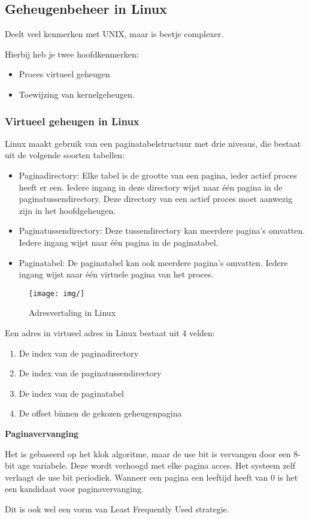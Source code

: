 \subsection{Geheugenbeheer in Linux}

Deelt veel kenmerken met UNIX, maar is beetje complexer. 

Hierbij heb je twee hoofdkenmerken:

\begin{itemize}
\item Proces virtueel geheugen
\item Toewijzing van kernelgeheugen.
\end{itemize}

\subsubsection{Virtueel geheugen in Linux}

Linux maakt gebruik van een paginatabelstructuur met drie niveaus, die bestaat uit de volgende soorten tabellen:

\begin{itemize}
\item Paginadirectory: Elke tabel is de grootte van een pagina, ieder actief proces heeft er een. Iedere ingang in deze directory wijst naar één pagina in de paginatussendirectory. Deze directory van een actief proces moet aanwezig zijn in het hoofdgeheugen.
\item Paginatussendirectory: Deze tussendirectory kan meerdere pagina’s omvatten. Iedere ingang wijst naar één pagina in de paginatabel.
\item Paginatabel: De paginatabel kan ook meerdere pagina’s omvatten. Iedere ingang wijst naar één virtuele pagina van het proces.
\end{itemize}

\begin{figure}[htp]
    \centering
            \texttt{[image: img/]}
        \caption{Adresvertaling in Linux}
    \label{fig:Adresvertaling in Linux}
\end{figure}

Een adres in virtueel adres in Linux bestaat uit 4 velden:

\begin{enumerate}
\item De index van de paginadirectory
\item De index van de paginatussendirectory
\item De index van de paginatabel
\item De offset binnen de gekozen geheugenpagina
\end{enumerate}


\textbf{Paginavervanging}

Het is gebaseerd op het klok algoritme, maar de use bit is vervangen door een 8-bit age variabele. Deze wordt verhoogd met elke pagina acces. Het systeem zelf verlaagt de use bit periodiek. Wanneer een pagina een leeftijd heeft van 0 is het een kandidaat voor paginavervanging.

Dit is ook wel een vorm van Least Frequently Used strategie.
